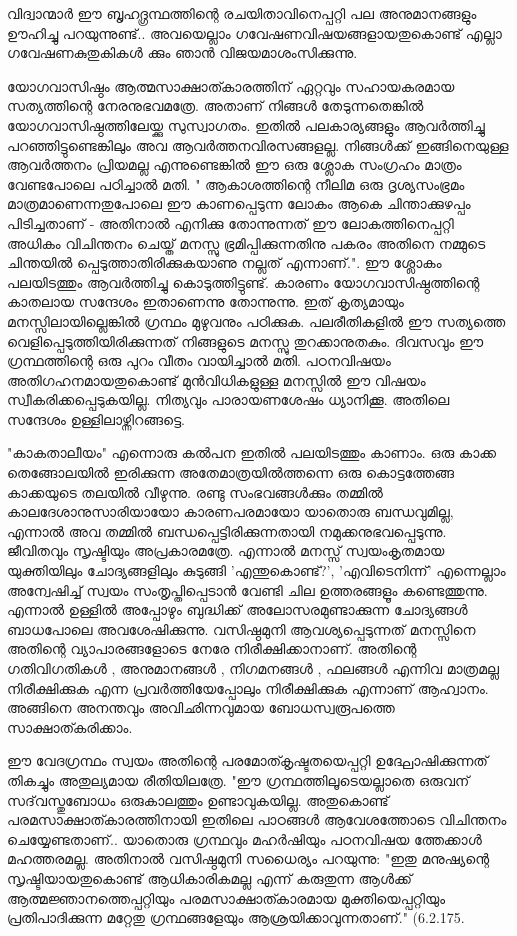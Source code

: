 \newpage
{}

വിദ്വാന്മാര്‍ ഈ ബൃഹദ്ഗ്രന്ഥത്തിന്റെ രചയിതാവിനെപ്പറ്റി പല അനുമാനങ്ങളും ഊഹിച്ചു പറയുന്നുണ്ട്‌.. അവയെല്ലാം ഗവേഷണവിഷയങ്ങളായതുകൊണ്ട്‌ എല്ലാ ഗവേഷണകുതുകികള്‍ ക്കും ഞാന്‍ വിജയമാശംസിക്കുന്നു.

യോഗവാസിഷ്ഠം ആത്മസാക്ഷാത്കാരത്തിന്‌ ഏറ്റവും സഹായകരമായ സത്യത്തിന്റെ നേരനുഭവമത്രേ. അതാണ്‌ നിങ്ങള്‍ തേടുന്നതെങ്കില്‍ യോഗവാസിഷ്ഠത്തിലേയ്ക്കു സുസ്വാഗതം. ഇതില്‍ പലകാര്യങ്ങളും ആവര്‍ത്തിച്ചു പറഞ്ഞിട്ടുണ്ടെങ്കിലും അവ ആവര്‍ത്തനവിരസങ്ങളല്ല. നിങ്ങള്‍ക്ക്‌ ഇങ്ങിനെയുള്ള   ആവര്‍ത്തനം പ്രിയമല്ല എന്നുണ്ടെങ്കില്‍ ഈ ഒരു ശ്ലോക സംഗ്രഹം  മാത്രം വേണ്ടപോലെ പഠിച്ചാല്‍ മതി. " ആകാശത്തിന്റെ നീലിമ ഒരു ദൃശ്യസംഭ്രമം മാത്രമാണെന്നതുപോലെ ഈ കാണപ്പെടുന്ന ലോകം ആകെ ചിന്താക്കുഴപ്പം പിടിച്ചതാണ്‌ - അതിനാല്‍ എനിക്കു തോന്നുന്നത്‌ ഈ ലോകത്തിനെപ്പറ്റി അധികം വിചിന്തനം ചെയ്ത്‌ മനസ്സു ഭ്രമിപ്പിക്കുന്നതിനു പകരം അതിനെ നമ്മുടെ ചിന്തയില്‍ പ്പെടുത്താതിരിക്കുകയാണു നല്ലത്‌ എന്നാണ്‌.".  ഈ ശ്ലോകം പലയിടത്തും ആവര്‍ത്തിച്ചു കൊടുത്തിട്ടുണ്ട്‌. കാരണം യോഗവാസിഷ്ഠത്തിന്റെ കാതലായ സന്ദേശം ഇതാണെന്നു തോന്നുന്നു. ഇത്‌ കൃത്യമായും മനസ്സിലായില്ലെങ്കില്‍ ഗ്രന്ഥം മുഴുവനും പഠിക്കുക. പലരീതികളില്‍ ഈ സത്യത്തെ വെളിപ്പെടുത്തിയിരിക്കുന്നത്‌ നിങ്ങളുടെ മനസ്സു തുറക്കാനുതകും. ദിവസവും ഈ ഗ്രന്ഥത്തിന്റെ ഒരു പുറം വീതം വായിച്ചാല്‍ മതി. പഠനവിഷയം അതിഗഹനമായതുകൊണ്ട്‌ മുന്‍വിധികളുള്ള മനസ്സില്‍ ഈ  വിഷയം സ്വീകരിക്കപ്പെടുകയില്ല. നിത്യവും പാരായണശേഷം ധ്യാനിക്കൂ. അതിലെ സന്ദേശം ഉള്ളിലാഴ്ന്നിറങ്ങട്ടെ.

"കാകതാലീയം" എന്നൊരു കല്‍പന ഇതില്‍ പലയിടത്തും കാണാം. ഒരു കാക്ക തെങ്ങോലയില്‍ ഇരിക്കുന്ന അതേമാത്രയില്‍ത്തന്നെ ഒരു കൊട്ടത്തേങ്ങ കാക്കയുടെ തലയില്‍ വീഴുന്നു. രണ്ടു സംഭവങ്ങള്‍ക്കും തമ്മില്‍ കാലദേശാനുസാരിയായോ കാരണപരമായോ യാതൊരു ബന്ധവുമില്ല, എന്നാല്‍ അവ തമ്മില്‍ ബന്ധപ്പെട്ടിരിക്കുന്നതായി നമുക്കനുഭവപ്പെടുന്നു. ജീവിതവും സൃഷ്ടിയും അപ്രകാരമത്രേ. എന്നാല്‍ മനസ്സ്‌ സ്വയംകൃതമായ യുക്തിയിലും ചോദ്യങ്ങളിലും കുടുങ്ങി 'എന്തുകൊണ്ട്‌?', 'എവിടെനിന്ന്' എന്നെല്ലാം അന്വേഷിച്ച്  സ്വയം സംതൃപ്തിപ്പെടാന്‍ വേണ്ടി ചില ഉത്തരങ്ങളൂം കണ്ടെത്തുന്നു. എന്നാല്‍ ഉള്ളില്‍ അപ്പോഴും ബുദ്ധിക്ക്‌ അലോസരമുണ്ടാക്കുന്ന ചോദ്യങ്ങള്‍ ബാധപോലെ അവശേഷിക്കുന്നു. വസിഷ്ഠമുനി ആവശ്യപ്പെടുന്നത്‌ മനസ്സിനെ അതിന്റെ വ്യാപാരങ്ങളോടെ നേരേ നിരീക്ഷിക്കാനാണ്‌. അതിന്റെ ഗതിവിഗതികള്‍ , അനുമാനങ്ങള്‍ , നിഗമനങ്ങള്‍ , ഫലങ്ങള്‍ എന്നിവ മാത്രമല്ല നിരീക്ഷിക്കുക എന്ന പ്രവര്‍ത്തിയേപ്പോലും നിരീക്ഷിക്കുക എന്നാണ്‌ ആഹ്വാനം. അങ്ങിനെ അനന്തവും അവിഛിന്നവുമായ ബോധസ്വരൂപത്തെ സാക്ഷാത്കരിക്കാം.

ഈ വേദഗ്രന്ഥം സ്വയം അതിന്റെ പരമോത്കൃഷ്ടതയെപ്പറ്റി ഉദ്ഘോഷിക്കുന്നത്‌ തികച്ചും അതുല്യമായ രീതിയിലത്രേ. "ഈ ഗ്രന്ഥത്തിലൂടെയല്ലാതെ ഒരുവന്‌ സദ്‌വസ്തുബോധം ഒരുകാലത്തും ഉണ്ടാവുകയില്ല. അതുകൊണ്ട്‌ പരമസാക്ഷാത്കാരത്തിനായി ഇതിലെ പാഠങ്ങള്‍ ആവേശത്തോടെ വിചിന്തനം ചെയ്യേണ്ടതാണ്‌.. യാതൊരു ഗ്രന്ഥവും മഹര്‍ഷിയും പഠനവിഷയ ത്തേക്കാള്‍ മഹത്തരമല്ല. അതിനാല്‍ വസിഷ്ഠമുനി സധൈര്യം പറയുന്നു: "ഇതു മനുഷ്യന്റെ സൃഷ്ടിയായതുകൊണ്ട്‌ ആധികാരികമല്ല എന്ന് കരുതുന്ന ആള്‍ക്ക്‌ ആത്മജ്ഞാനത്തെപ്പറ്റിയും പരമസാക്ഷാത്കാരമായ മുക്തിയെപ്പറ്റിയും പ്രതിപാദിക്കുന്ന മറ്റേതു ഗ്രന്ഥങ്ങളേയും ആശ്രയിക്കാവുന്നതാണ്‌." (6.2.175.

